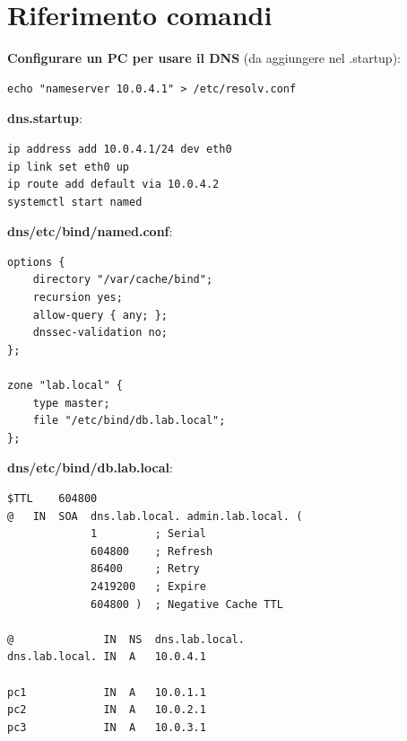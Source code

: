 \documentclass[a4paper,11pt]{article}
\begin{document}
\vfill

\section*{Riferimento comandi}

\textbf{Configurare un PC per usare il DNS} (da aggiungere nel .startup):
\begin{lstlisting}
echo "nameserver 10.0.4.1" > /etc/resolv.conf
\end{lstlisting}

\textbf{dns.startup}:
\begin{lstlisting}
ip address add 10.0.4.1/24 dev eth0
ip link set eth0 up
ip route add default via 10.0.4.2
systemctl start named
\end{lstlisting}

\textbf{dns/etc/bind/named.conf}:
\begin{lstlisting}
options {
    directory "/var/cache/bind";
    recursion yes;
    allow-query { any; };
    dnssec-validation no;
};

zone "lab.local" {
    type master;
    file "/etc/bind/db.lab.local";
};
\end{lstlisting}

\textbf{dns/etc/bind/db.lab.local}:
\begin{lstlisting}
$TTL    604800
@   IN  SOA  dns.lab.local. admin.lab.local. (
             1         ; Serial
             604800    ; Refresh
             86400     ; Retry
             2419200   ; Expire
             604800 )  ; Negative Cache TTL

@              IN  NS  dns.lab.local.
dns.lab.local. IN  A   10.0.4.1

pc1            IN  A   10.0.1.1
pc2            IN  A   10.0.2.1
pc3            IN  A   10.0.3.1
\end{lstlisting}
\end{document}
